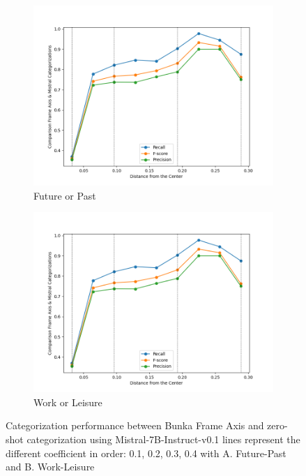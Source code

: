 \documentclass{article}
\begin{document}
\begin{figure}
 \begin{subfigure}{0.49\textwidth}
     \centering
     \includegraphics[width=\linewidth]{img/classification_comparison/future-past_comparison.png}
     \caption{Future or Past}
     \label{fig:a}
 \end{subfigure}
 \hfill
 \begin{subfigure}{0.49\textwidth}
     \centering
      \includegraphics[width=\linewidth]{img/classification_comparison/future-past_comparison.png}
     \caption{Work or Leisure}
     \label{fig:b}
 \end{subfigure}
 \caption{Categorization performance between Bunka Frame Axis and zero-shot categorization using Mistral-7B-Instruct-v0.1  lines represent the different coefficient in order: 0.1, 0.2, 0.3, 0.4 with A. Future-Past and B. Work-Leisure} %
\end{figure}
\end{document}
